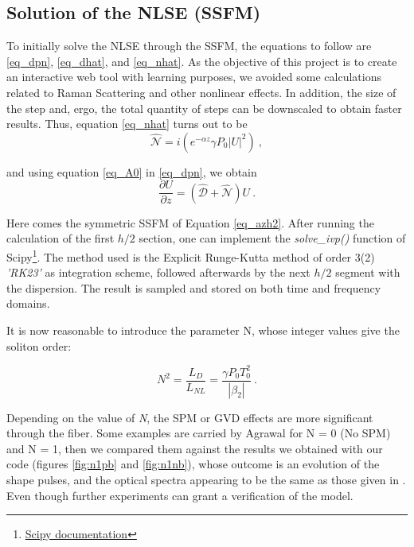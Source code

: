         \subsection{Solution of the NLSE (SSFM)}\label{subsec:nlse}
            To initially solve the NLSE through the SSFM, the equations to follow are \eqref{eq_dpn}, \eqref{eq_dhat}, and \eqref{eq_nhat}. As the objective of this project is to create an interactive web tool with learning purposes, we avoided some calculations related to Raman Scattering and other nonlinear effects. In addition, the size of the step and, ergo, the total quantity of steps can be downscaled to obtain faster results. Thus, equation \eqref{eq_nhat} turns out to be 
            \begin{equation} \label{eq_nhat2}
             \hat{\mathcal{N}} = i \left( 
             e^{-\alpha z} \gamma P_0 \left|U\right|^2 
             \right) \ ,
        \end{equation}
        
        and using equation \eqref{eq_A0} in \eqref{eq_dpn}, we obtain
        \begin{equation}\label{eq_dpn2}
            \frac{\partial U}{\partial z} = \left( \hat{\mathcal{D}} + \hat{\mathcal{N}} \right) U \ . 
        \end{equation}
        
        Here comes the symmetric SSFM of Equation \eqref{eq_azh2}. After running the calculation of the first $h/2$ section, one can implement the \emph{solve\_ivp()} function of Scipy\footnote{\href{https://docs.scipy.org/doc/scipy/reference/generated/scipy.integrate.solve_ivp.html}{Scipy documentation}}. The method used is the Explicit Runge-Kutta method of order 3(2) \emph{'RK23'} as integration scheme, followed afterwards by the next $h/2$ segment with the dispersion. The result is sampled and stored on both time and frequency domains. 
        
        It is now reasonable to introduce the parameter N, whose integer values give the soliton order:
        
        \begin{equation}\label{eq_n}
            N^2 = \frac{L_D}{L_{NL}} = \frac{\gamma P_0 T^2_0  }{\left|\beta_2\right|}\ .
        \end{equation}
        
        
        Depending on the value of \emph{N}, the SPM or GVD effects are more significant through the fiber. Some examples are carried by Agrawal \citep{AgrawalBook} for N = 0 (No SPM) and N = 1, then we compared them against the results we obtained with our code (figures \ref{fig:n1pb} and \ref{fig:n1nb}), whose outcome is an evolution of the shape pulses, and the optical spectra appearing to be the same as those given in \citep{AgrawalBook}. Even though further experiments can grant a verification of the model.
        
